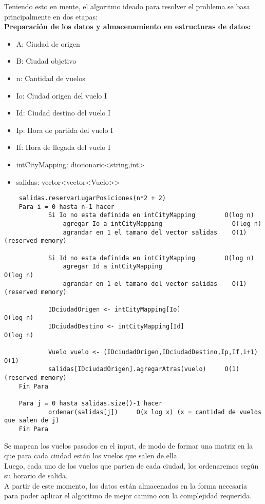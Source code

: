 Teniendo esto en mente, el algoritmo ideado para resolver el problema se basa principalmente en dos etapas:\\

\textbf{Preparación de los datos y almacenamiento en estructuras de datos:}


\begin{itemize}
\item A: Ciudad de origen
\item B: Ciudad objetivo
\item n: Cantidad de vuelos
\item Io: Ciudad origen del vuelo I
\item Id: Ciudad destino del vuelo I
\item Ip: Hora de partida del vuelo I
\item If: Hora de llegada del vuelo I
\item intCityMapping: diccionario\textless string,int\textgreater
\item salidas: vector\textless vector\textless Vuelo\textgreater\textgreater \\
\end{itemize}
\begin{lstlisting}
	salidas.reservarLugarPosiciones(n*2 + 2)
	Para i = 0 hasta n-1 hacer
			Si Io no esta definida en intCityMapping        O(log n)
				agregar	Io a intCityMapping                   O(log n)	
				agrandar en 1 el tamano del vector salidas    O(1) (reserved memory)
				
			Si Id no esta definida en intCityMapping        O(log n)
				agregar	Id a intCityMapping				            O(log n)	
				agrandar en 1 el tamano del vector salidas    O(1) (reserved memory)	
		
			IDciudadOrigen <- intCityMapping[Io]				    O(log n)
			IDciudadDestino <- intCityMapping[Id]				    O(log n)			
			
			Vuelo vuelo <- (IDciudadOrigen,IDciudadDestino,Ip,If,i+1)	  O(1)		
			salidas[IDciudadOrigen].agregarAtras(vuelo)     O(1) (reserved memory)
	Fin Para	
			
	Para j = 0 hasta salidas.size()-1 hacer
			ordenar(salidas[j])		O(x log x) (x = cantidad de vuelos que salen de j)
	Fin Para
\end{lstlisting}

Se mapean los vuelos pasados en el input, de modo de formar una matriz en la que para cada ciudad están los vuelos que salen de ella.\\
Luego, cada uno de los vuelos que parten de cada ciudad, los ordenaremos según su horario de salida.\\
A partir de este momento, los datos están almacenados en la forma necesaria para poder aplicar el algoritmo de mejor camino con la complejidad requerida.\\\\
\newpage	


